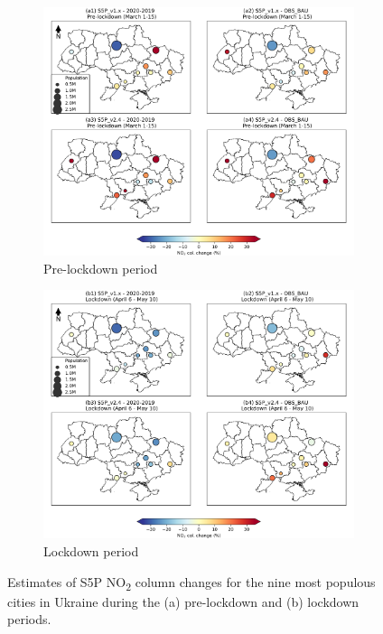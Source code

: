 \begin{figure}[p]
    \centering
    \begin{subfigure}{\textwidth}
      \centering
      \includegraphics[width=.8\textwidth]{figs/chap3/fig5_a.png}
      \caption{Pre-lockdown period}
      \label{fig:chap3_fig5a}
    \end{subfigure}

    \begin{subfigure}{\textwidth}
      \centering
      \includegraphics[width=.8\textwidth]{figs/chap3/fig5_b.png}
      \caption{Lockdown period}
      \label{fig:chap3_fig5b}
    \end{subfigure}
    \caption[S5P NO\textsubscript{2} level changes for most populous cities]{Estimates of S5P NO\textsubscript{2} column changes for the nine most populous cities in Ukraine during the (a) pre-lockdown and (b) lockdown periods.}
    \label{fig:chap3_fig5}
\end{figure}

